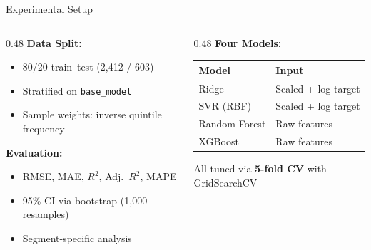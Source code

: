 \documentclass[aspectratio=169]{beamer}
\begin{document}
    \begin{frame}{Experimental Setup}
        \begin{columns}[T]
            \begin{column}{0.48\textwidth}
                \textbf{Data Split:}
                \begin{itemize}
                    \item 80/20 train--test (2,412 / 603)
                    \item Stratified on \texttt{base\_model}
                    \item Sample weights: inverse quintile frequency
                \end{itemize}

                \vspace{1em}
                \textbf{Evaluation:}
                \begin{itemize}
                    \item RMSE, MAE, $R^2$, Adj.\ $R^2$, MAPE
                    \item 95\% CI via bootstrap (1,000 resamples)
                    \item Segment-specific analysis
                \end{itemize}
            \end{column}
            \begin{column}{0.48\textwidth}
                \textbf{Four Models:}
                \vspace{0.5em}
                \small
                \begin{tabular}{ll}
                    \toprule
                    \textbf{Model} & \textbf{Input}      \\
                    \midrule
                    Ridge          & Scaled + log target \\
                    SVR (RBF)      & Scaled + log target \\
                    Random Forest  & Raw features        \\
                    XGBoost        & Raw features        \\
                    \bottomrule
                \end{tabular}

                \vspace{1em}
                \normalsize
                All tuned via \textbf{5-fold CV} with GridSearchCV
            \end{column}
        \end{columns}
    \end{frame}
\end{document}
